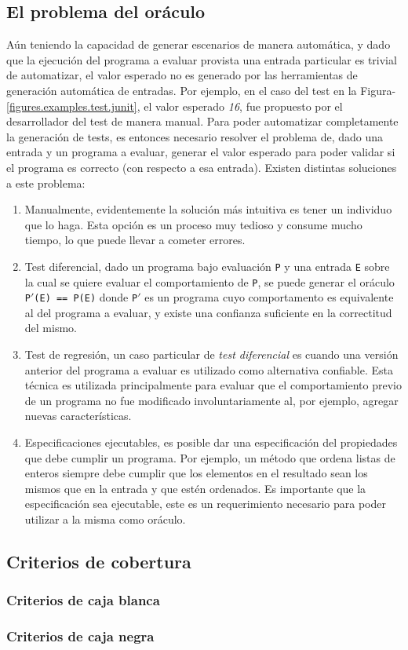 \subsection{El problema del or\'aculo}

A\'un teniendo la capacidad de generar escenarios de manera autom\'atica, y dado que la ejecuci\'on del programa a evaluar provista una entrada particular es trivial de automatizar, el valor esperado no es generado por las herramientas de generaci\'on autom\'atica de entradas. Por ejemplo, en el caso del test en la Figura-\ref{figures.examples.test.junit}, el valor esperado \emph{16}, fue propuesto por el desarrollador del test de manera manual. Para poder automatizar completamente la generaci\'on de tests, es entonces necesario resolver el problema de, dado una entrada y un programa a evaluar, generar el valor esperado para poder validar si el programa es correcto (con respecto a esa entrada). Existen distintas soluciones a este problema:
\begin{enumerate}
	\item Manualmente, evidentemente la soluci\'on m\'as intuitiva es tener un individuo que lo haga. Esta opci\'on es un proceso muy tedioso y consume mucho tiempo, lo que puede llevar a cometer errores.
	
	\item Test diferencial, dado un programa bajo evaluaci\'on \texttt{P} y una entrada \texttt{E} sobre la cual se quiere evaluar el comportamiento de \texttt{P}, se puede generar el or\'aculo \texttt{P$\prime$(E) == P(E)} donde \texttt{P$\prime$} es un programa cuyo comportamento es equivalente al del programa a evaluar, y existe una confianza suficiente en la correctitud del mismo.
	
	\item Test de regresi\'on, un caso particular de \emph{test diferencial} es cuando una versi\'on anterior del programa a evaluar es utilizado como alternativa confiable. Esta t\'ecnica es utilizada principalmente para evaluar que el comportamiento previo de un programa no fue modificado involuntariamente al, por ejemplo, agregar nuevas caracter\'isticas.
	
	\item Especificaciones ejecutables, es posible dar una especificaci\'on del propiedades que debe cumplir un programa. Por ejemplo, un m\'etodo que ordena listas de enteros siempre debe cumplir que los elementos en el resultado sean los mismos que en la entrada y que est\'en ordenados. Es importante que la especificaci\'on sea ejecutable, este es un requerimiento necesario para poder utilizar a la misma como or\'aculo.
\end{enumerate}

\subsection{Criterios de cobertura}
\label{sec:preliminares.testing.covcriteria}

\subsubsection{Criterios de caja blanca}

\subsubsection{Criterios de caja negra}